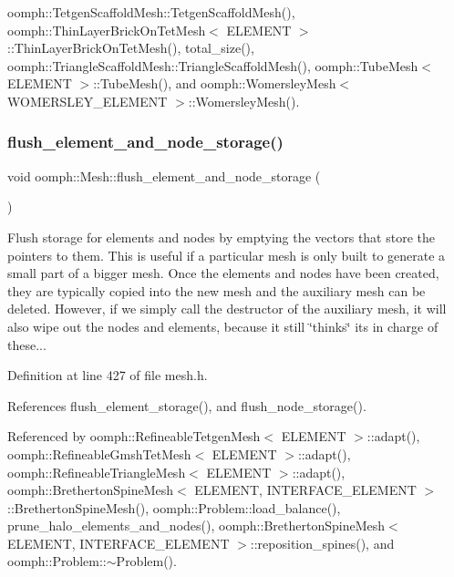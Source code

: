 oomph\+::\+Tetgen\+Scaffold\+Mesh\+::\+Tetgen\+Scaffold\+Mesh(), oomph\+::\+Thin\+Layer\+Brick\+On\+Tet\+Mesh$<$ E\+L\+E\+M\+E\+N\+T $>$\+::\+Thin\+Layer\+Brick\+On\+Tet\+Mesh(), total\+\_\+size(), oomph\+::\+Triangle\+Scaffold\+Mesh\+::\+Triangle\+Scaffold\+Mesh(), oomph\+::\+Tube\+Mesh$<$ E\+L\+E\+M\+E\+N\+T $>$\+::\+Tube\+Mesh(), and oomph\+::\+Womersley\+Mesh$<$ W\+O\+M\+E\+R\+S\+L\+E\+Y\+\_\+\+E\+L\+E\+M\+E\+N\+T $>$\+::\+Womersley\+Mesh().

\mbox{\label{classoomph_1_1Mesh_a38446e721be2f75a64fdaa025b7c23ad}} 
\subsubsection{\texorpdfstring{flush\+\_\+element\+\_\+and\+\_\+node\+\_\+storage()}{flush\_element\_and\_node\_storage()}}
{\footnotesize\ttfamily void oomph\+::\+Mesh\+::flush\+\_\+element\+\_\+and\+\_\+node\+\_\+storage (\begin{DoxyParamCaption}{ }\end{DoxyParamCaption})\hspace{0.3cm}{\ttfamily [inline]}}



Flush storage for elements and nodes by emptying the vectors that store the pointers to them. This is useful if a particular mesh is only built to generate a small part of a bigger mesh. Once the elements and nodes have been created, they are typically copied into the new mesh and the auxiliary mesh can be deleted. However, if we simply call the destructor of the auxiliary mesh, it will also wipe out the nodes and elements, because it still \char`\"{}thinks\char`\"{} it\textquotesingle{}s in charge of these... 



Definition at line 427 of file mesh.\+h.



References flush\+\_\+element\+\_\+storage(), and flush\+\_\+node\+\_\+storage().



Referenced by oomph\+::\+Refineable\+Tetgen\+Mesh$<$ E\+L\+E\+M\+E\+N\+T $>$\+::adapt(), oomph\+::\+Refineable\+Gmsh\+Tet\+Mesh$<$ E\+L\+E\+M\+E\+N\+T $>$\+::adapt(), oomph\+::\+Refineable\+Triangle\+Mesh$<$ E\+L\+E\+M\+E\+N\+T $>$\+::adapt(), oomph\+::\+Bretherton\+Spine\+Mesh$<$ E\+L\+E\+M\+E\+N\+T, I\+N\+T\+E\+R\+F\+A\+C\+E\+\_\+\+E\+L\+E\+M\+E\+N\+T $>$\+::\+Bretherton\+Spine\+Mesh(), oomph\+::\+Problem\+::load\+\_\+balance(), prune\+\_\+halo\+\_\+elements\+\_\+and\+\_\+nodes(), oomph\+::\+Bretherton\+Spine\+Mesh$<$ E\+L\+E\+M\+E\+N\+T, I\+N\+T\+E\+R\+F\+A\+C\+E\+\_\+\+E\+L\+E\+M\+E\+N\+T $>$\+::reposition\+\_\+spines(), and oomph\+::\+Problem\+::$\sim$\+Problem().

